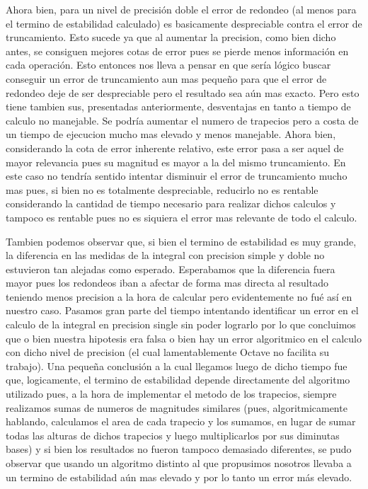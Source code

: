 \documentclass[11pt,a4paper]{article}
\begin{document}
Ahora bien, para un nivel de precisión doble el error de redondeo (al menos para el termino de estabilidad calculado) es basicamente despreciable contra el error de truncamiento. Esto sucede ya que al aumentar la precision, como bien dicho antes, se consiguen mejores cotas de error pues se pierde menos información en cada operación. Esto entonces nos lleva a pensar en que sería lógico buscar conseguir un error de truncamiento aun mas pequeño para que el error de redondeo deje de ser despreciable pero el resultado sea aún mas exacto. Pero esto tiene tambien sus, presentadas anteriormente, desventajas en tanto a tiempo de calculo no manejable. Se podría aumentar el numero de trapecios pero a costa de un tiempo de ejecucion mucho mas elevado y menos manejable. Ahora bien, considerando la cota de error inherente relativo, este error pasa a ser aquel de mayor relevancia pues su magnitud es mayor a la del mismo truncamiento. En este caso no tendría sentido intentar disminuir el error de truncamiento mucho mas pues, si bien no es totalmente despreciable, reducirlo no es rentable considerando la cantidad de tiempo necesario para realizar dichos calculos y tampoco es rentable pues no es siquiera el error mas relevante de todo el calculo.

Tambien podemos observar que, si bien el termino de estabilidad es muy grande, la diferencia en las medidas de la integral con precision simple y doble no estuvieron tan alejadas como esperado. Esperabamos que la diferencia fuera mayor pues los redondeos iban a afectar de forma mas directa al resultado teniendo menos precision a la hora de calcular pero evidentemente no fué así en nuestro caso. Pasamos gran parte del tiempo intentando identificar un error en el calculo de la integral en precision single sin poder lograrlo por lo que concluimos que o bien nuestra hipotesis era falsa o bien hay un error algoritmico en el calculo con dicho nivel de precision (el cual lamentablemente Octave no facilita su trabajo). Una pequeña conclusión a la cual llegamos luego de dicho tiempo fue que, logicamente, el termino de estabilidad depende directamente del algoritmo utilizado pues, a la hora de implementar el metodo de los trapecios, siempre realizamos sumas de numeros de magnitudes similares (pues, algoritmicamente hablando, calculamos el area de cada trapecio y los sumamos, en lugar de sumar todas las alturas de dichos trapecios y luego multiplicarlos por sus diminutas bases) y si bien los resultados no fueron tampoco demasiado diferentes, se pudo observar que usando un algoritmo distinto al que propusimos nosotros llevaba a un termino de estabilidad aún mas elevado y por lo tanto un error más elevado.
\end{document}
